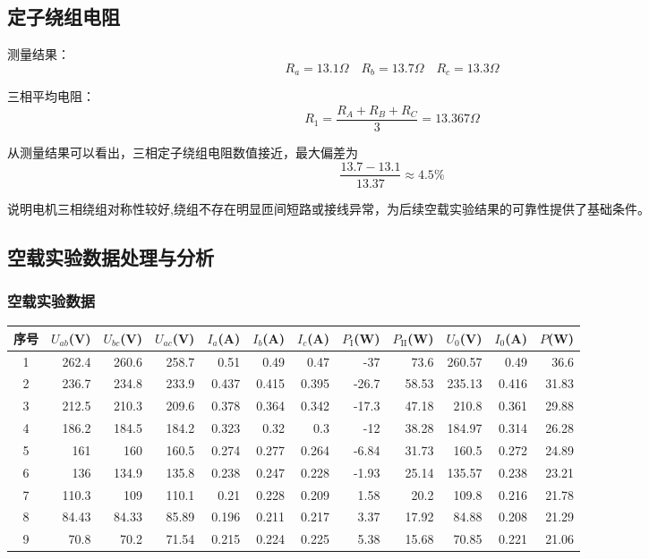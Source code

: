 \documentclass[12pt,a4paper]{article}
\begin{document}
\subsection{定子绕组电阻}

测量结果：
\begin{equation*}
R_{a} = 13.1\Omega \quad R_{b} = 13.7\Omega \quad R_{c} = 13.3\Omega
\end{equation*}

三相平均电阻：
\begin{equation*}
R_{1} = \frac{R_{A} + R_{B} + R_{C}}{3} = 13.367\Omega
\end{equation*}

从测量结果可以看出，三相定子绕组电阻数值接近，最大偏差为
\begin{equation*}
\frac{13.7 - 13.1}{13.37} \approx 4.5\%
\end{equation*}

说明电机三相绕组对称性较好,绕组不存在明显匝间短路或接线异常，为后续空载实验结果的可靠性提供了基础条件。

\subsection{空载实验数据处理与分析}

\subsubsection{空载实验数据}

\begin{table}[H]
\centering
\small
\begin{tabular}{crrrrrrrr|rrr}
\toprule
序号 & $U_{ab}$(V) & $U_{bc}$(V) & $U_{ac}$(V) & $I_{a}$(A) & $I_{b}$(A) & $I_{c}$(A) & $P_{\text{I}}$(W) & $P_{\text{II}}$(W) & $U_{0}$(V) & $I_{0}$(A) & $P$(W) \\
\midrule
1 & 262.4 & 260.6 & 258.7 & 0.51 & 0.49 & 0.47 & -37 & 73.6 & 260.57 & 0.49 & 36.6 \\
2 & 236.7 & 234.8 & 233.9 & 0.437 & 0.415 & 0.395 & -26.7 & 58.53 & 235.13 & 0.416 & 31.83 \\
3 & 212.5 & 210.3 & 209.6 & 0.378 & 0.364 & 0.342 & -17.3 & 47.18 & 210.8 & 0.361 & 29.88 \\
4 & 186.2 & 184.5 & 184.2 & 0.323 & 0.32 & 0.3 & -12 & 38.28 & 184.97 & 0.314 & 26.28 \\
5 & 161 & 160 & 160.5 & 0.274 & 0.277 & 0.264 & -6.84 & 31.73 & 160.5 & 0.272 & 24.89 \\
6 & 136 & 134.9 & 135.8 & 0.238 & 0.247 & 0.228 & -1.93 & 25.14 & 135.57 & 0.238 & 23.21 \\
7 & 110.3 & 109 & 110.1 & 0.21 & 0.228 & 0.209 & 1.58 & 20.2 & 109.8 & 0.216 & 21.78 \\
8 & 84.43 & 84.33 & 85.89 & 0.196 & 0.211 & 0.217 & 3.37 & 17.92 & 84.88 & 0.208 & 21.29 \\
9 & 70.8 & 70.2 & 71.54 & 0.215 & 0.224 & 0.225 & 5.38 & 15.68 & 70.85 & 0.221 & 21.06 \\
\bottomrule
\end{tabular}
\end{table}
\end{document}
